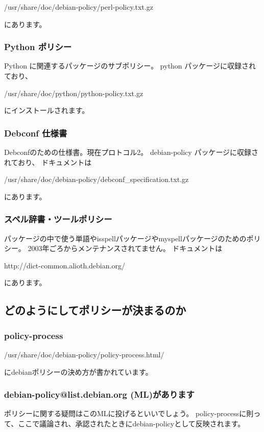\documentclass[mingoth,a4paper]{jsarticle}
\begin{document}
        /usr/share/doc/debian-policy/perl-policy.txt.gz

        にあります。

    \subsubsection{Python ポリシー}
        Python に関連するパッケージのサブポリシー。
        python パッケージに収録されており、

        /usr/share/doc/python/python-policy.txt.gz

        にインストールされます。

    \subsubsection{Debconf 仕様書}
        Debconfのための仕様書。現在プロトコル2。
        debian-policy パッケージに収録されており、
        ドキュメントは

        /usr/share/doc/debian-policy/debconf\_specification.txt.gz

        にあります。

    \subsubsection{スペル辞書・ツールポリシー}
        パッケージの中で使う単語やisspellパッケージやmyspellパッケージのためのポリシー。
        2003年ごろからメンテナンスされてません。
	ドキュメントは

	http://dict-common.alioth.debian.org/

	にあります。
\subsection{どのようにしてポリシーが決まるのか}

    \subsubsection{policy-process}
        /usr/share/doc/debian-policy/policy-process.html/

        にdebianポリシーの決め方が書かれています。

    \subsubsection{debian-policy@list.debian.org (ML)があります}
        ポリシーに関する疑問はこのMLに投げるといいでしょう。
        policy-processに則って、ここで議論され、承認されたときにdebian-policyとして反映されます。
\end{document}
